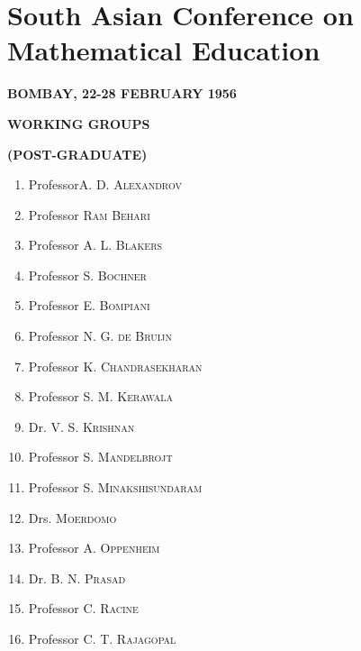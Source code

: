 \chapter{South Asian Conference on Mathematical Education}

\begin{center}
{\bf BOMBAY, 22-28 FEBRUARY 1956}
\medskip

{\large\bf WORKING GROUPS}
\medskip

{\bf (POST-GRADUATE)}
\end{center}
\medskip

\setcounter{pageoriginal}{176}
\begin{enumerate}
\itemsep=2pt
\item Professor\pageoriginale \textsc{A. D. Alexandrov}

\item Professor \textsc{Ram Behari}

\item Professor \textsc{A. L. Blakers}

\item Professor \textsc{S. Bochner}

\item Professor \textsc{E. Bompiani}

\item Professor \textsc{N. G. de Bruijn}

\item Professor \textsc{K. Chandrasekharan}

\item Professor \textsc{S. M. Kerawala}

\item Dr. \textsc{V. S. Krishnan}

\item Professor \textsc{S. Mandelbrojt}

\item Professor \textsc{S. Minakshisundaram}

\item Drs. \textsc{Moerdomo}

\item Professor \textsc{A. Oppenheim}

\item Dr. \textsc{B. N. Prasad}

\item Professor \textsc{C. Racine}

\item Professor \textsc{C. T. Rajagopal}


\end{enumerate}
